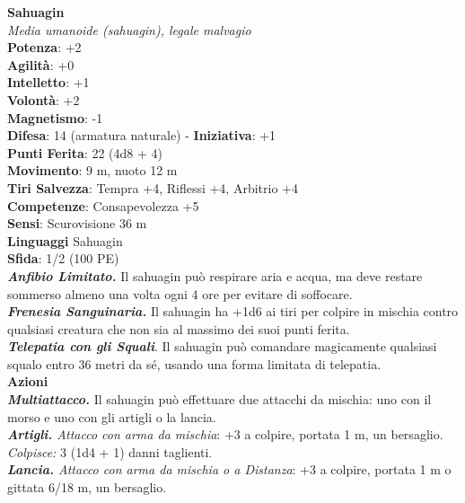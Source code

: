 \begin{multicols}{2}
\medskip\textbf{Sahuagin}\\
\emph{Media umanoide (sahuagin), legale malvagio}\\
\textbf{Potenza}: +2\\
\textbf{Agilità}: +0\\
\textbf{Intelletto}: +1\\
\textbf{Volontà}: +2\\
\textbf{Magnetismo}: -1\\
\textbf{Difesa}: 14 (armatura naturale) - \textbf{Iniziativa}: +1\\
\textbf{Punti Ferita}: 22 (4d8 + 4)\\
\textbf{Movimento}: 9 m, nuoto 12 m\\
\textbf{Tiri Salvezza}: Tempra +4, Riflessi +4, Arbitrio +4\\
\textbf{Competenze}: Consapevolezza +5\\
\textbf{Sensi}: Scurovisione 36 m\\
\textbf{Linguaggi} Sahuagin\\
\textbf{Sfida}: 1/2 (100 PE)\smallskip\\
\emph{\textbf{Anfibio Limitato.}} Il sahuagin può respirare aria e acqua, ma deve restare sommerso almeno una volta ogni 4 ore per evitare di soffocare.\\

\emph{\textbf{Frenesia Sanguinaria.}} Il sahuagin ha +1d6 ai tiri per colpire in mischia contro qualsiasi creatura che non sia al massimo dei suoi punti ferita.\\

\emph{\textbf{Telepatia con gli Squali}}. Il sahuagin può comandare magicamente qualsiasi squalo entro 36 metri da sé, usando una forma limitata di telepatia.\\

\smallskip\textbf{Azioni}\\

\emph{\textbf{Multiattacco.}} Il sahuagin può effettuare due attacchi da mischia: uno con il morso e uno con gli artigli o la lancia.\\
\emph{\textbf{Artigli.} Attacco con arma da mischia}: +3 a colpire, portata 1 m, un bersaglio.\\
\emph{Colpisce:} 3 (1d4 + 1) danni taglienti.\\
\emph{\textbf{Lancia.} Attacco con arma da mischia o a Distanza}: +3 a colpire, portata 1 m o gittata 6/18 m, un bersaglio.\\


\end{multicols}

